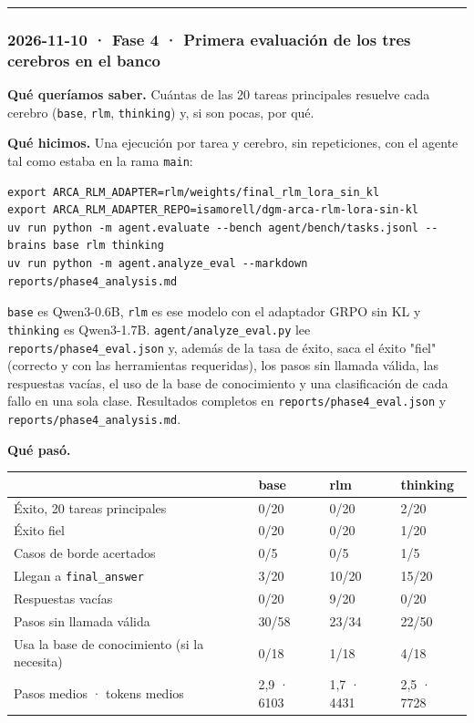 \begin{center}\rule{0.5\linewidth}{0.5pt}\end{center}

\subsubsection{2026-11-10 · Fase 4 · Primera evaluación de los tres cerebros en el banco}

\textbf{Qué queríamos saber.} Cuántas de las 20 tareas principales resuelve cada cerebro (\texttt{base}, \texttt{rlm},
\texttt{thinking}) y, si son pocas, por qué.

\textbf{Qué hicimos.} Una ejecución por tarea y cerebro, sin repeticiones, con el agente tal como estaba en la
rama \texttt{main}:

\begin{lstlisting}
export ARCA_RLM_ADAPTER=rlm/weights/final_rlm_lora_sin_kl
export ARCA_RLM_ADAPTER_REPO=isamorell/dgm-arca-rlm-lora-sin-kl
uv run python -m agent.evaluate --bench agent/bench/tasks.jsonl --brains base rlm thinking
uv run python -m agent.analyze_eval --markdown reports/phase4_analysis.md
\end{lstlisting}

\texttt{base} es Qwen3-0.6B, \texttt{rlm} es ese modelo con el adaptador GRPO sin KL y \texttt{thinking} es Qwen3-1.7B.
\texttt{agent/\allowbreak{}analyze\_\allowbreak{}eval.py} lee \texttt{reports/\allowbreak{}phase4\_\allowbreak{}eval.json} y, además de la tasa de éxito, saca el éxito
"fiel" (correcto y con las herramientas requeridas), los pasos sin llamada válida, las respuestas vacías,
el uso de la base de conocimiento y una clasificación de cada fallo en una sola clase. Resultados
completos en \texttt{reports/\allowbreak{}phase4\_\allowbreak{}eval.json} y \texttt{reports/\allowbreak{}phase4\_\allowbreak{}analysis.md}.

\textbf{Qué pasó.}

{\def\LTcaptype{none} %
\small\setlength{\tabcolsep}{3pt}
\begin{longtable}[]{@{}llll@{}}
\toprule\noalign{}
& base & rlm & thinking \\
\midrule\noalign{}
\endhead
\bottomrule\noalign{}
\endlastfoot
Éxito, 20 tareas principales & 0/20 & 0/20 & 2/20 \\
Éxito fiel & 0/20 & 0/20 & 1/20 \\
Casos de borde acertados & 0/5 & 0/5 & 1/5 \\
Llegan a \texttt{final\_\allowbreak{}answer} & 3/20 & 10/20 & 15/20 \\
Respuestas vacías & 0/20 & 9/20 & 0/20 \\
Pasos sin llamada válida & 30/58 & 23/34 & 22/50 \\
Usa la base de conocimiento (si la necesita) & 0/18 & 1/18 & 4/18 \\
Pasos medios · tokens medios & 2,9 · 6103 & 1,7 · 4431 & 2,5 · 7728 \\
\end{longtable}
}

